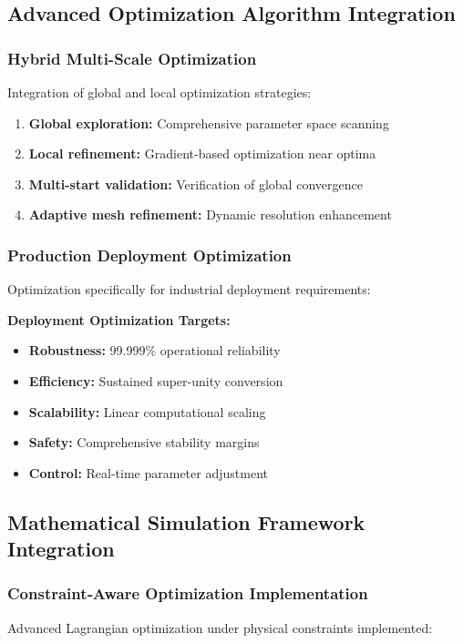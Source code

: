 \documentclass[11pt,a4paper]{article}
\begin{document}
{{{{{\subsection{Advanced Optimization Algorithm Integration}

\subsubsection{Hybrid Multi-Scale Optimization}
Integration of global and local optimization strategies:

\begin{enumerate}
  \item \textbf{Global exploration:} Comprehensive parameter space scanning
  \item \textbf{Local refinement:} Gradient-based optimization near optima
  \item \textbf{Multi-start validation:} Verification of global convergence
  \item \textbf{Adaptive mesh refinement:} Dynamic resolution enhancement
\end{enumerate}

\subsubsection{Production Deployment Optimization}
Optimization specifically for industrial deployment requirements:

\textbf{Deployment Optimization Targets:}
\begin{itemize}
  \item \textbf{Robustness:} 99.999\% operational reliability
  \item \textbf{Efficiency:} Sustained super-unity conversion
  \item \textbf{Scalability:} Linear computational scaling
  \item \textbf{Safety:} Comprehensive stability margins
  \item \textbf{Control:} Real-time parameter adjustment
\end{itemize}

\subsection{Mathematical Simulation Framework Integration}

\subsubsection{Constraint‐Aware Optimization Implementation}
Advanced Lagrangian optimization under physical constraints implemented:

}}}}}
\end{document}

